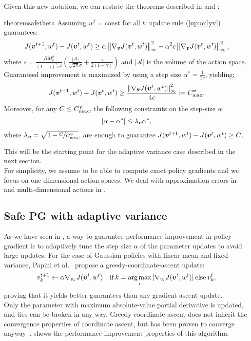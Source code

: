 Given this new notation, we can restate the theorems described in  and :
\begin{restatable}{theorem}{safetheta}\label{th:safetheta}
	Assuming $w^t = \text{const} $ for all $t$, update rule (\ref{up:onlyv}) guarantees:
	\begin{align}\label{stat:1_1}
	J(\vv^{t+1}, w^t) - J(\vv^t, w^t) \geq \alpha\norm[\infty]{\gradJ[\vv]{\vv^t,w^t}}^2 - 
	\alpha^2 c \norm[\infty]{\gradJ[\vv]{\vv^t,w^t}}^2,
	\end{align}
	where $c = \frac{RM_{\phi}^2}{(1-\gamma)^2\sigma^2}\left(\frac{|\mathcal{A}|}{\sqrt{2\pi}\sigma} +	\frac{\gamma}{2(1-\gamma)}\right)$ and  $|\mathcal{A}|$ is the volume of the action space. Guaranteed improvement is maximized by using a step size $\alpha^* = \frac{1}{2c}$, yielding:
	\begin{align}\label{stat:1_2}
	J(\vv^{t+1},w^t) - J(\vv^t,w^t) \geq \frac{\norm[\infty]{\gradJ{\vv^t,w^t}}^2}{4c}
	\coloneqq C_{\text{max}}^{\vv}.
	\end{align}
	Moreover, for any $C\leq C_{\text{max}}^{\vv}$, the following constraints on the step-size $\alpha$:
	\begin{align}\label{stat:1_3}
	|\alpha - \alpha^*| \leq \lambda_{\vv}\alpha^*, 
	\end{align}
	where $\lambda_{\vv}=\sqrt{1 - \nicefrac{C}{C_{\text{max}}^{\vv}}}$, are enough to guarantee $J(\vv^{t+1},w^t) - J(\vv^t,w^t)\geq C$.
\end{restatable}
This will be the starting point for the adaptive variance case described in the next section.\\
For simplicity, we assume to be able to compute exact policy gradients and we focus on one-dimensional action spaces. We deal with approximation errors in  and multi-dimensional actions in .

\subsection{Safe PG with adaptive variance}\label{sec:safe+explore}
As we have seen in , a way to guarantee performance improvement in policy gradient is to adaptively tune the step size $\alpha$ of the parameter updates to avoid large updates. For the case of Gaussian policies with linear mean and fixed variance, Papini et al.~\cite{adaptive_batch} propose a greedy-coordinate-ascent update:
\begin{align}\label{up:onlyv}
v_{k}^{t+1} \gets \alpha\gradJ[v_{k}]{\vv^t,w^t}
\quad \text{if}\:k =  \argmax_i |\gradJ[v_i]{\vv^t, w^t}| \:\text{else}\:v_{k}^t,
\end{align}
proving that it yields better guarantees than any gradient ascent update.\\
Only the parameter with maximum absolute-value partial derivative is updated, and ties can be broken in any way. Greedy coordinate ascent does not inherit the convergence properties of coordinate ascent, but has been proven to converge anyway~\cite{nutinicoordinate}.  shows the performance improvement properties of this algorithm.


